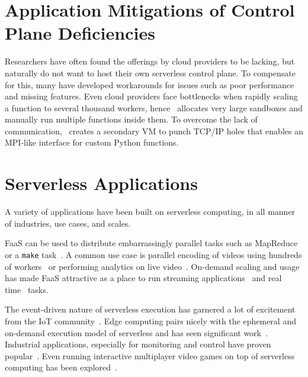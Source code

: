 \section{Application Mitigations of Control Plane Deficiencies}

Researchers have often found the offerings by cloud providers to be lacking, but naturally do not want to host their own serverless control plane.
To compensate for this, many have developed workarounds for issues such as poor performance and missing features.
Even cloud providers face bottlenecks when rapidly scaling a function to several thousand workers, hence~\cite{basu2023propack} allocates very large sandboxes and manually run multiple functions inside them.
To overcome the lack of communication,~\cite{copik2023fmi} creates a secondary VM to punch TCP/IP holes that enables an MPI-like interface for custom Python functions.


\section{Serverless Applications}
\label{sec:serverless-apps}

A variety of applications have been built on serverless computing, in all manner of industries, use cases, and scales.

FaaS can be used to distribute embarrassingly parallel tasks such as MapReduce~\cite{jonas2017occupy} or a \texttt{make} task~\cite{fouladi2019laptop}.
A common use case is parallel encoding of videos using hundreds of workers~\cite{ao2018sprocket, zhang2019video} or performing analytics on live video~\cite{romero2021llama, risco2021gpu}.
On-demand scaling and usage has made FaaS attractive as a place to run streaming applications~\cite{konstantoudakis2022serverless,wang2021wearmask,elordi2021demand} and real time~\cite{yan2016building,anand2019low} tasks.

The event-driven nature of serverless execution has garnered a lot of excitement from the IoT community~\cite{benedetti2021experimental,trilles2020iot,hu2020hivemind,persson2017kappa}.
Edge computing pairs nicely with the ephemeral and on-demand execution model of serverless and has seen significant work~\cite{cicconetti2020decentralized,cheng2019fog,wang2020supporting}.
Industrial applications, especially for monitoring and control have proven popular~\cite{hussain2019serverless,mete2021implementation,zhang2021serverless}.
Even running interactive multiplayer video games on top of serverless computing has been explored~\cite{donkervlietservo}.

